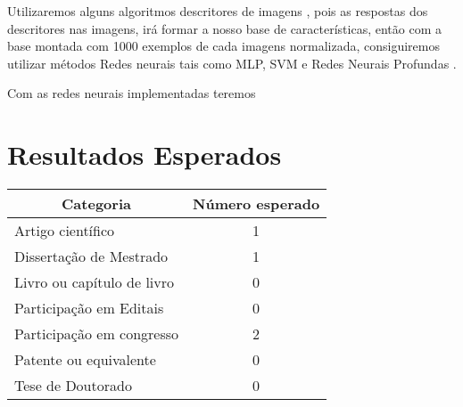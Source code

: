 \documentclass[12pt,a4paper,oneside]{book}
\begin{document}
{Utilizaremos alguns algoritmos descritores de imagens
\cite[Descritores]{}, pois as respostas dos descritores nas imagens,
ir\'{a} formar a nosso base de caracter\'{i}sticas, ent\~{a}o com a base montada
com 1000 exemplos de cada imagens normalizada, consiguiremos utilizar
m\'{e}todos Redes neurais \cite[Redes-neurais]{} tais como MLP, SVM e
Redes Neurais Profundas \cite[Deep-learn]{}.

Com as redes neurais implementadas teremos
\pagebreak
\chapter{Resultados Esperados}
\begin{center}
    \begin{tabular}{|l|c|}
        \hline
        \multicolumn{1}{|c|}{Categoria} & \multicolumn{1}{|c|}{N\'{u}mero
        esperado} \\ \hline
        Artigo cient\'{i}fico & 1 \\ \hline
        Disserta\c{c}\~{a}o de Mestrado & 1 \\ \hline
        Livro ou cap\'{i}tulo de livro & 0 \\ \hline
        Participa\c{c}\~{a}o em Editais & 0 \\ \hline
        Participa\c{c}\~{a}o em congresso & 2 \\ \hline
        Patente ou equivalente & 0 \\ \hline
        Tese de Doutorado & 0 \\ \hline
    \end{tabular}
\end{center}
\pagebreak
}
\end{document}
